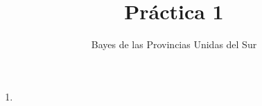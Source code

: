 \documentclass[a4paper,10pt]{article}
\title{Práctica 1}
\author{Bayes de las Provincias Unidas del Sur}
\begin{document}
\maketitle

\tableofcontents

\begin{enumerate}

\item

\end{enumerate}
\end{document}
